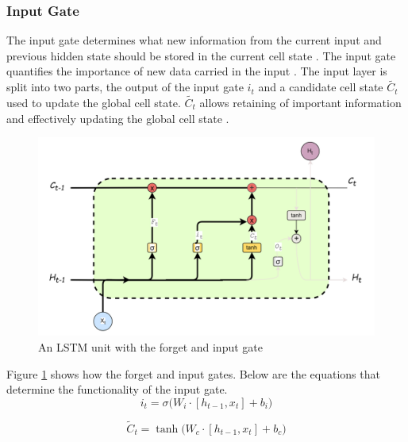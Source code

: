  \subsubsection{Input Gate}
 The input gate determines what new information from the current input and previous hidden state should be stored in the current cell state \cite{rafi2021short}. 
 The input gate quantifies the importance of new data carried in the input \cite{stryker_ibm_rnn}. The input layer is split into two parts, the output of the input gate $i_t$ and a candidate cell state $\tilde{C_t}$ used to update the global cell state. $\tilde{C_t}$ allows retaining of important information and effectively updating the global cell state \cite{zhu2025novel}.
\begin{figure}[h]
	\centering
	\includegraphics[width=0.7\linewidth]{Chapters/images/forget_inputgates}
	\caption{An LSTM unit with the forget and input gate }
	\label{fig:forgetinputgates}
\end{figure}

Figure \ref{fig:forgetinputgates} shows how the forget and input gates. Below are the equations that determine the functionality of the input gate. %
\[
i_t = \sigma \Big( W_i \cdot [h_{t-1}, x_t] + b_i \Big)
\label{eqn:inputgate}
\]

\[
\tilde{C}_t = \tanh \Big( W_c \cdot [h_{t-1}, x_t] + b_c \Big)
\label{eqn:candidatecell}
\]


